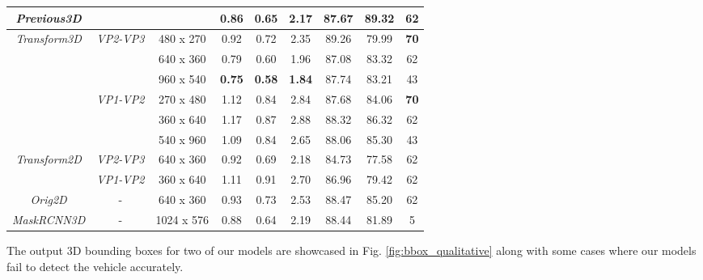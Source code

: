 \documentclass[twocolumn]{svjour3}          \smartqed  \usepackage{graphicx}
\begin{document}
\begin{table*}[]
{\begin{tabular}{|c|c|c|c|c|c|c|c|c|}
\textit{Previous3D}\cite{CVWW2019}      &                                   &                             & 0.86  & 0.65  & 2.17  & 87.67 & 89.32 & 62           \\ \hline
\multirow{6}{*}{\textit{Transform3D}}   & \multirow{3}{*}{\textit{VP2-VP3}} & 480 x 270                   & 0.92  & 0.72  & 2.35  & 89.26 & 79.99 & \textbf{70} \\ \cline{3-9} 
                                        &                                   & 640 x 360                   & 0.79  & 0.60  & 1.96  & 87.08 & 83.32 & 62          \\ \cline{3-9} 
                                        &                                   & 960 x 540                   & \textbf{0.75} & \textbf{0.58} & \textbf{1.84} & 87.74 & 83.21 & 43          \\ \cline{2-9} 
                                        & \multirow{3}{*}{\textit{VP1-VP2}} & 270 x 480                   & 1.12  & 0.84  & 2.84  & 87.68 & 84.06 & \textbf{70} \\ \cline{3-9} 
                                        &                                   & 360 x 640                   & 1.17  & 0.87  & 2.88  & 88.32 & 86.32 & 62          \\ \cline{3-9} 
                                        &                                   & 540 x 960                   & 1.09  & 0.84  & 2.65  & 88.06 & 85.30 & 43          \\ \hline
\multirow{2}{*}{\textit{Transform2D}}   & \textit{VP2-VP3}                  & 640 x 360                   & 0.92  & 0.69  & 2.18  & 84.73 & 77.58 & 62          \\ \cline{2-9} 
                                        & \textit{VP1-VP2}                  & 360 x 640                   & 1.11  & 0.91  & 2.70  & 86.96 & 79.42 & 62          \\ \hline
\textit{Orig2D}                         & -                                 & 640 x 360                   & 0.93  & 0.73  & 2.53  & 88.47 & 85.20 & 62          \\ \hline
\textit{MaskRCNN3D}                     & -                                 & 1024 x 576                  & 0.88  & 0.64  & 2.19  & 88.44 & 81.89 & 5          \\ \hline
\end{tabular}}
\end{table*}

The output 3D bounding boxes for two of our models are showcased in Fig. \ref{fig:bbox_qualitative} along with some cases where our models fail to detect the vehicle accurately. 
\end{document}

